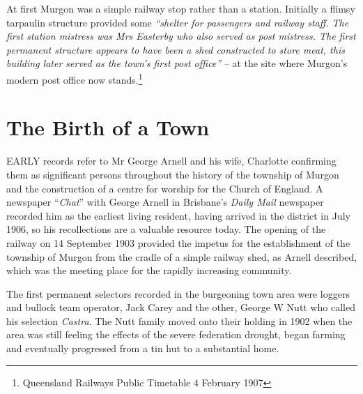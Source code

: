 At first Murgon was a simple railway stop rather than a station. Initially a flimsy tarpaulin structure provided some \emph{``shelter for passengers and railway staff. The first station mistress was Mrs Easterby who also served as post mistress. The first permanent structure appears to have been a shed constructed to store meat, this building later served as the town's first post office''} -- at the site where Murgon's modern post office now stands.\footnote{Queensland Railways Public Timetable 4 February 1907}


\printendnotes[custom]
\setcounter{endnote}{0}




\chapter{The Birth of a Town}
\nobalance


\lettrine[lines=3]{E}{ARLY}
 records refer to Mr George Arnell and his wife, Charlotte confirming them as significant persons throughout the history of the township of Murgon and the construction of a centre for worship for the Church of England. A newspaper ``\emph{Chat}'' with George Arnell in Brisbane's \emph{Daily Mail} newspaper recorded him as the earliest living resident\emph{,} having arrived in the district in July 1906, so his recollections are a valuable resource today. The opening of the railway on 14 September 1903 provided the impetus for the establishment of the township of Murgon from the cradle of a simple railway shed, as Arnell described, which was the meeting place for the rapidly increasing community.

The first permanent selectors recorded in the burgeoning town area were loggers and bullock team operator, Jack Carey and the other, George W Nutt who called his selection \emph{Castra}. The Nutt family moved onto their holding in 1902 when the area was still feeling the effects of the severe federation drought, began farming and eventually progressed from a tin hut to a substantial home.









